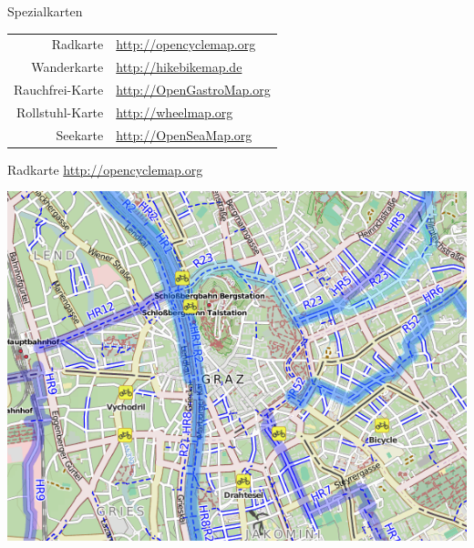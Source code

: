 \documentclass{beamer}
\begin{document}
\begin{frame}{Spezialkarten}

  \begin{table}[htbp]
    \centering
    \begin{tabular}{r|l}
      Radkarte  &  \url{http://opencyclemap.org} \\
      Wanderkarte & \url{http://hikebikemap.de} \\
      Rauchfrei-Karte & \url{http://OpenGastroMap.org} \\
      Rollstuhl-Karte & \url{http://wheelmap.org} \\
      Seekarte & \url{http://OpenSeaMap.org} \\
    \end{tabular}
  \end{table}

\end{frame}

\begin{frame}{Radkarte}
\url{http://opencyclemap.org}

\begin{center}
\includegraphics[width=.6\paperwidth]{cyclemap.png}
\end{center}
\end{frame}
\end{document}
